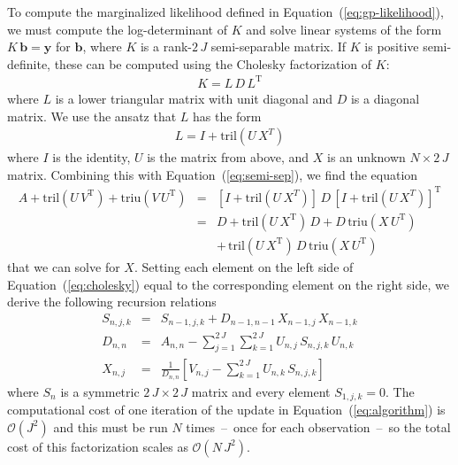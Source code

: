 \documentclass[manuscript, letterpaper]{aastex6}
\makeatletter
\let\origsubsection\subsection
\renewcommand\subsection{\@ifstar{\starsubsection}{\nostarsubsection}}
\newcommand\nostarsubsection[1]{\subsectionprelude\origsubsection{#1}}
\newcommand\starsubsection[1]{\subsectionprelude\origsubsection*{#1}}
\newcommand\subsectionprelude{\vspace{1em}}
\renewcommand{\eqref}[1]{\ref{eq:#1}}
\newcommand{\Eq}[1]{Equation~(\eqref{#1})}
\newcommand{\eq}[1]{\Eq{#1}}
\newcommand{\eqlabel}[1]{\label{eq:#1}}
\newcommand{\T}{\ensuremath{\mathrm{T}}}
\newcommand{\bvec}[1]{{\ensuremath{\boldsymbol{#1}}}}
\makeatother
\begin{document}
To compute the marginalized likelihood defined in \eq{gp-likelihood}, we must
compute the log-determinant of $K$ and solve linear systems of the form
$K\,\bvec{b}=\bvec{y}$ for $\bvec{b}$, where $K$ is a rank-$2\,J$
semi-separable matrix.
If $K$ is positive semi-definite, these can be computed using the Cholesky
factorization of $K$:
\begin{eqnarray}
K = L\,D\,L^\T
\end{eqnarray}
where $L$ is a lower triangular matrix with unit diagonal and $D$ is a
diagonal matrix.
We use the ansatz that $L$ has the form
\begin{eqnarray}
    L = I + \mathrm{tril} (U\,X^T)
\end{eqnarray}
where $I$ is the identity, $U$ is the matrix from above, and $X$ is an unknown
$N \times 2\,J$ matrix.
Combining this with \eq{semi-sep}, we find the equation
\begin{eqnarray}\eqlabel{cholesky}
A + \mathrm{tril}(U\,V^\T) + \mathrm{triu}(V\,U^\T)
&=& \left[I + \mathrm{tril} (U\,X^T)\right]\,D\,
    {\left[I + \mathrm{tril} (U\,X^T)\right]}^\T \\
&=& D + \mathrm{tril}(U\,X^\T)\,D
    + D\,\mathrm{triu}(X\,U^\T) \nonumber\\
&& +\, \mathrm{tril}(U\,X^\T)\,D\,\mathrm{triu}(X\,U^\T) \nonumber
\end{eqnarray}
that we can solve for $X$.
Setting each element on the left side of \eq{cholesky} equal to the
corresponding element on the right side, we derive the following recursion
relations
\begin{eqnarray}
S_{n,j,k} &=& S_{n-1,j,k} + D_{n-1,n-1}\,X_{n-1,j}\,X_{n-1,k} \nonumber\\
D_{n,n} &=& A_{n,n} -
    \sum_{j=1}^{2\,J}\sum_{k=1}^{2\,J} U_{n,j}\,S_{n,j,k}\,U_{n,k}
    \nonumber\\
X_{n,j} &=& \frac{1}{D_{n,n}}\left[ V_{n,j} -
    \sum_{k=1}^{2\,J}U_{n,k}\,S_{n,j,k} \right]
    \eqlabel{algorithm}
\end{eqnarray}
where $S_n$ is a symmetric $2\,J \times 2\,J$ matrix and every element
$S_{1,j,k}=0$.
The computational cost of one iteration of the update in \eq{algorithm} is
$\mathcal{O}(J^2)$ and this must be run $N$ times~--~once for each
observation~--~so the total cost of this factorization scales as
$\mathcal{O}(N\,J^2)$.


\subsection{Pre-conditioning}
\end{document}

